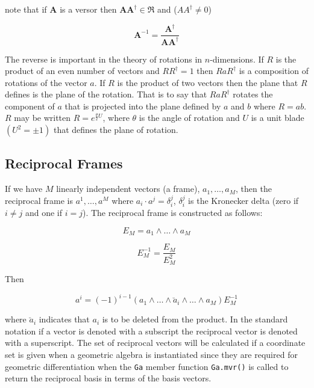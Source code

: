 \documentclass[12pt]{report}
\newcommand{\bm}[1]{\boldsymbol{#1}}
\newcommand{\bfrac}[2]{\displaystyle\frac{#1}{#2}}
\newcommand{\lp}{\left (}
\newcommand{\rp}{\right )}
\newcommand{\W}{\wedge}
\newcommand{\R}{\dagger}
\newcommand{\T}[1]{\texttt{#1}}
\begin{document}
note that if $\bm{A}$ is a versor then $\bm{A}\bm{A}^{\R}\in\Re$ and ($AA^{\R} \ne 0$)

   \begin{equation}
      \bm{A}^{-1} = \bfrac{\bm{A}^{\R}}{\bm{AA}^{\R}}
   \end{equation}

The reverse is important in the theory of rotations in $n$-dimensions.  If
$R$ is the product of an even number of vectors and $RR^{\R} = 1$
then $RaR^{\R}$ is a composition of rotations of the vector $a$.
If $R$ is the product of two vectors then the plane that $R$ defines
is the plane of the rotation.  That is to say that $RaR^{\R}$ rotates the
component of $a$ that is projected into the plane defined by $a$ and
$b$ where $R=ab$. $R$ may be written
$R = e^{\frac{\theta}{2}U}$, where $\theta$ is the angle of rotation
and $U$ is a unit blade $\lp U^{2} = \pm 1\rp$ that defines the
plane of rotation.

\subsection{Reciprocal Frames}

If we have $M$ linearly independent vectors (a frame),
$a_{1},\dots,a_{M}$, then the reciprocal frame is
$a^{1},\dots,a^{M}$ where $a_{i}\cdot a^{j} = \delta_{i}^{j}$,
$\delta_{i}^{j}$ is the Kronecker delta (zero if $i \ne j$ and one
if $i = j$). The reciprocal frame is constructed as follows:

  \begin{equation}
    E_{M} = a_{1}\W\dots\W a_{M}
  \end{equation}

  \begin{equation}
    E_{M}^{-1} = \bfrac{E_{M}}{E_{M}^{2}}
  \end{equation}

Then

  \begin{equation}
    a^{i} = \lp -1\rp^{i-1}\lp a_{1}\W\dots\W \breve{a}_{i} \W\dots\W a_{M}\rp E_{M}^{-1}
  \end{equation}

where $\breve{a}_{i}$ indicates that $a_{i}$ is to be deleted from
the product.  In the standard notation if a vector is denoted with a subscript
the reciprocal vector is denoted with a superscript. The set of reciprocal vectors
will be calculated if a coordinate set is given when a geometric algebra is instantiated since
they are required for geometric differentiation when the \T{Ga} member function \T{Ga.mvr()}
is called to return the reciprocal basis in terms of the basis vectors.
\end{document}
